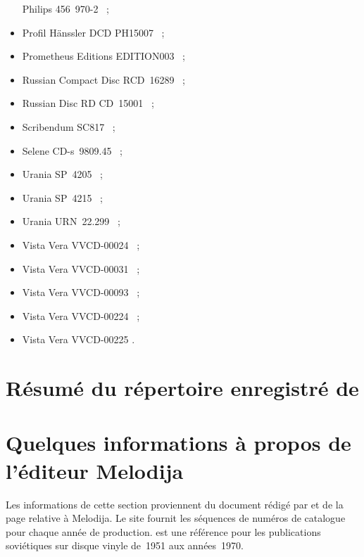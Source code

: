 \begin{itemize}
 Philips 456~\hbox{970-2} \citep{Johnson, Moreau, Szersnovicz99,
 VincentLancrin, Young99}~;
 \item
 Profil Hänssler DCD PH15007 \citep{Beyne, Bigorie, Boissard15, Church,
 Greenbank, Harrington15b, Hulot}~;
 \item
 Prometheus Editions EDITION003 \citep{Fanning03, Morrison02, Potter,
 Sturrock}~;
 \item
 Russian Compact Disc RCD~16289 \citep{Masters19}~;
 \item
 Russian Disc RD CD~15001 \citep{Evans93, Hoffele}~;
 \item
 Scribendum SC817 \citep{Chizynski, Distler20, Hoffele20}~;
 \item
 Selene \hbox{CD-s}~9809.45 \citep{Rabinowitz99}~;
 \item
 Urania SP~4205 \citep{Danzin, Lompech03}~;
 \item
 Urania SP~4215 \citep{Bolen}~;
 \item
 Urania URN~22.299 \citep{DiazGomez}~;
 \item
 Vista Vera VVCD-00024 \citep{Marcinik, Woolf04a}~;
 \item
 Vista Vera VVCD-00031 \citep{Woolf04b}~;
 \item
 Vista Vera VVCD-00093 \citep{Harrington07, Lewis}~;
 \item
 Vista Vera VVCD-00224 \citep{Woolf11a}~;
 \item
 Vista Vera VVCD-00225 \citep{Woolf11b}.
\end{itemize}

\section[%
Résumé du répertoire enregistré de Vladimir Sofronickij]{%
Résumé du répertoire enregistré de \VSofronitsky{}}


\section{Quelques informations à propos de l'éditeur Melodija}

Les informations de cette section proviennent du document rédigé par
\citet{Crocker} et de la page \citet{WikipediaMelodiya} relative à Melodija.
Le site \citet{Rockdisco} fournit les séquences de numéros de catalogue pour
chaque année de production.
\citet{Bennett} est une référence pour les publications soviétiques sur
disque vinyle de~1951 aux années~1970.

